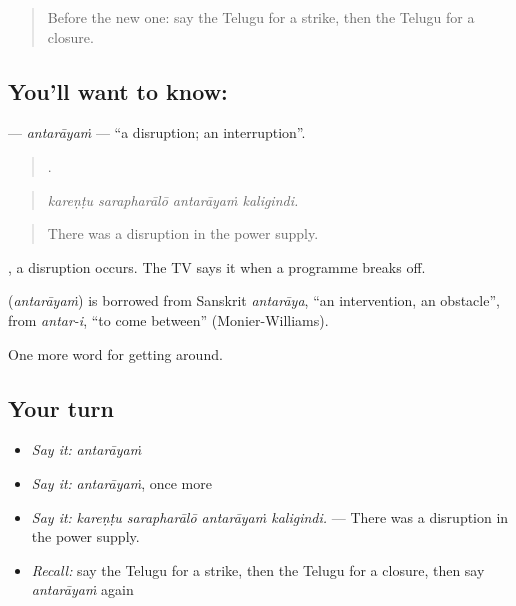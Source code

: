 \label{lesson:TE-C469-antarayam}



\begin{quote}
Before the new one: say the Telugu for a strike, then the Telugu for a closure.
\end{quote}

\subsection*{You'll want to know: }
\textbf{} — \emph{antarāyaṁ} — \textquotedblleft{}a disruption; an interruption\textquotedblright{}.

\begin{quote}
   .
\end{quote}

\begin{quote}
\emph{kareṇṭu sarapharālō antarāyaṁ kaligindi.}
\end{quote}

\begin{quote}
There was a disruption in the power supply.
\end{quote}

 , a disruption occurs. The TV says it when a programme breaks off.

\begin{cousinweb}
\textbf{} (\emph{antarāyaṁ}) is borrowed from Sanskrit \emph{antarāya}, \textquotedblleft{}an intervention, an obstacle\textquotedblright{}, from \emph{antar-i}, \textquotedblleft{}to come between\textquotedblright{} (Monier-Williams).
\end{cousinweb}

\begin{grammarlens}[title={What you've built}]
One more word for getting around.
\end{grammarlens}

\subsection*{Your turn}
\begin{itemize}
\raggedright
  \item \emph{Say it:} \emph{antarāyaṁ}
  \item \emph{Say it:} \emph{antarāyaṁ}, once more
  \item \emph{Say it:} \emph{kareṇṭu sarapharālō antarāyaṁ kaligindi.} — There was a disruption in the power supply.
  \item \emph{Recall:} say the Telugu for a strike, then the Telugu for a closure, then say \emph{antarāyaṁ} again
\end{itemize}

